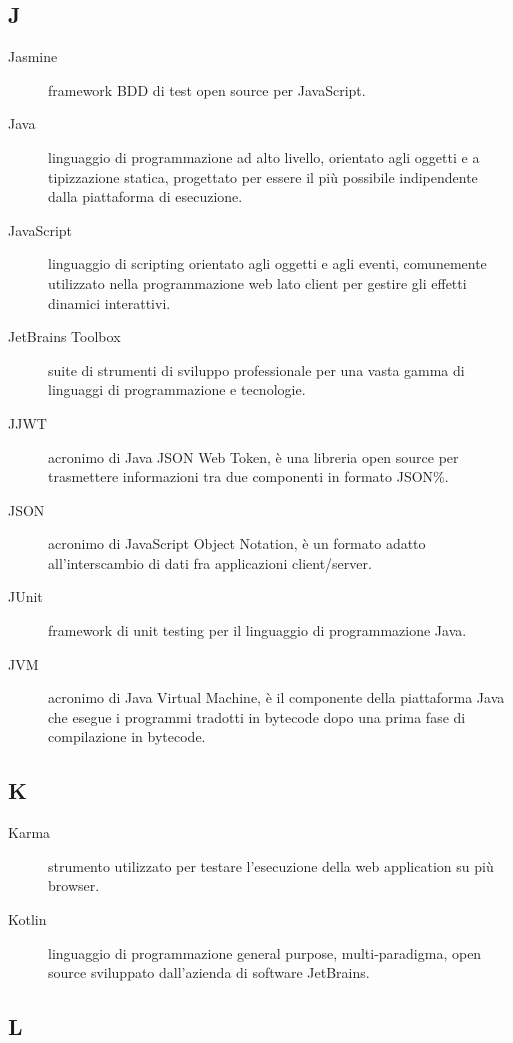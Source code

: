 \documentclass[../../../manuale.sviluppatore.tex]{subfiles}
\begin{document}
\subsection{J}

\begin{description}
    \item[Jasmine] framework BDD di test open source per JavaScript.
    \item[Java] linguaggio di programmazione ad alto livello, orientato agli oggetti e a tipizzazione statica, progettato per essere il più possibile indipendente dalla piattaforma di esecuzione.
    \item[JavaScript] linguaggio di scripting orientato agli oggetti e agli eventi, comunemente utilizzato nella programmazione web lato client per gestire gli effetti dinamici interattivi.
    \item[JetBrains Toolbox] suite di strumenti di sviluppo professionale per una vasta gamma di linguaggi di programmazione e tecnologie.
    \item[JJWT] acronimo di Java JSON Web Token, è una libreria open source per trasmettere informazioni tra due componenti in formato JSON\%.
    \item[JSON] acronimo di JavaScript Object Notation, è un formato adatto all'interscambio di dati fra applicazioni client/server.
    \item[JUnit] framework di unit testing per il linguaggio di programmazione Java.
    \item[JVM] acronimo di Java Virtual Machine, è il componente della piattaforma Java che esegue i programmi tradotti in bytecode dopo una prima fase di compilazione in bytecode.
\end{description}

\subsection{K}

\begin{description}
    \item[Karma] strumento utilizzato per testare l'esecuzione della web application su più browser.
    \item[Kotlin] linguaggio di programmazione general purpose, multi-paradigma, open source sviluppato dall'azienda di software JetBrains.
\end{description}

\subsection{L}
\end{document}
